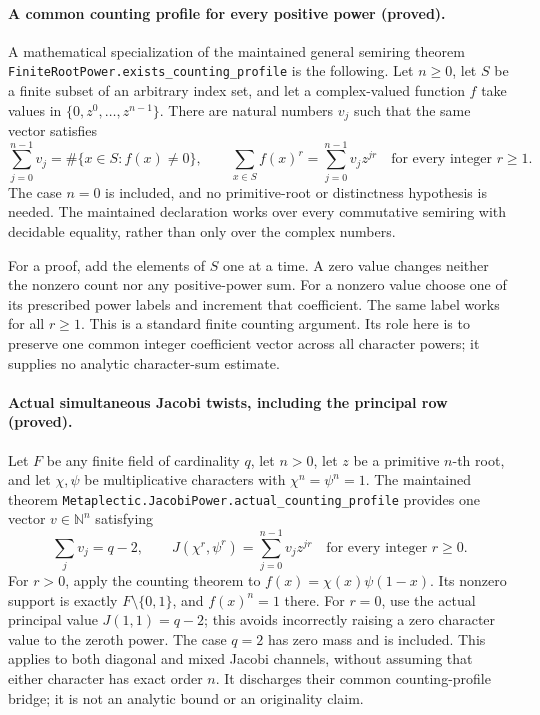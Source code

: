 \documentclass[11pt]{article}
\begin{document}
\paragraph{A common counting profile for every positive power (proved).}
A mathematical specialization of the maintained general semiring theorem
\texttt{FiniteRootPower.exists\_counting\_profile} is the following.
Let \(n\ge0\), let \(S\) be a finite subset of an arbitrary index set,
and let a complex-valued function \(f\) take values in
\(\{0,z^0,\ldots,z^{n-1}\}\). There are natural numbers \(v_j\)
such that the same vector satisfies
\[
 \sum_{j=0}^{n-1}v_j=\#\{x\in S:f(x)\ne0\},\qquad
 \sum_{x\in S}f(x)^r=\sum_{j=0}^{n-1}v_jz^{jr}
 \quad\text{for every integer }r\ge1.
\]
The case \(n=0\) is included, and no primitive-root or distinctness
hypothesis is needed. The maintained declaration works over every
commutative semiring with decidable equality, rather than only
over the complex numbers.

For a proof, add the elements of \(S\) one at a time. A zero value
changes neither the nonzero count nor any positive-power sum.
For a nonzero value choose one of its prescribed power labels and
increment that coefficient. The same label works for all \(r\ge1\).
This is a standard finite counting argument. Its role here is to
preserve one common integer coefficient vector across all character
powers; it supplies no analytic character-sum estimate.

\paragraph{Actual simultaneous Jacobi twists, including the principal row (proved).}
Let \(F\) be any finite field of cardinality \(q\), let \(n>0\),
let \(z\) be a primitive \(n\)-th root, and let \(\chi,\psi\)
be multiplicative characters with \(\chi^n=\psi^n=1\).
The maintained theorem
\texttt{Metaplectic.JacobiPower.actual\_counting\_profile}
provides one vector \(v\in\mathbb N^n\) satisfying
\[
 \sum_jv_j=q-2,\qquad
 J(\chi^r,\psi^r)=\sum_{j=0}^{n-1}v_jz^{jr}
 \quad\text{for every integer }r\ge0.
\]
For \(r>0\), apply the counting theorem to
\(f(x)=\chi(x)\psi(1-x)\). Its nonzero support is exactly
\(F\setminus\{0,1\}\), and \(f(x)^n=1\) there.
For \(r=0\), use the actual principal value
\(J(1,1)=q-2\); this avoids incorrectly raising a zero
character value to the zeroth power. The case \(q=2\) has zero
mass and is included. This applies to both diagonal and mixed
Jacobi channels, without assuming that either character has exact
order \(n\). It discharges their common counting-profile bridge;
it is not an analytic bound or an originality claim.
\end{document}
